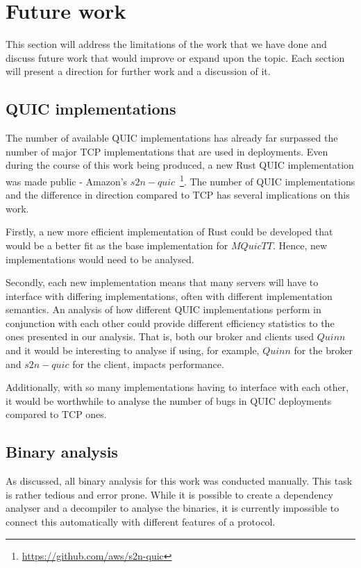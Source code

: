 \section{Future work} \label{sec:future_work}

This section will address the limitations of the work that we have done and discuss future work that would improve or expand upon the topic.
Each section will present a direction for further work and a discussion of it.

\subsection{QUIC implementations}

The number of available QUIC implementations has already far surpassed the number of major TCP implementations that are used in deployments.
Even during the course of this work being produced, a new Rust QUIC implementation was made public - Amazon's $s2n-quic$~\footnote{\url{https://github.com/aws/s2n-quic}}.
The number of QUIC implementations and the difference in direction compared to TCP has several implications on this work.

Firstly, a new more efficient implementation of Rust could be developed that would be a better fit as the base implementation for $MQuicTT$.
Hence, new implementations would need to be analysed.

Secondly, each new implementation means that many servers will have to interface with differing implementations, often with different implementation semantics.
An analysis of how different QUIC implementations perform in conjunction with each other could provide different efficiency statistics to the ones presented in our analysis.
That is, both our broker and clients used $Quinn$ and it would be interesting to analyse if using, for example, $Quinn$ for the broker and $s2n-quic$ for the client, impacts performance.

Additionally, with so many implementations having to interface with each other, it would be worthwhile to analyse the number of bugs in QUIC deployments compared to TCP ones.

\subsection{Binary analysis}

As discussed, all binary analysis for this work was conducted manually.
This task is rather tedious and error prone.
While it is possible to create a dependency analyser and a decompiler to analyse the binaries, it is currently impossible to connect this automatically with different features of a protocol.

